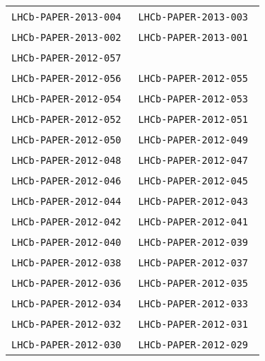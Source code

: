\begin{center}
\begin{longtable}{ll}
\texttt{LHCb-PAPER-2013-004}~\cite{LHCb-PAPER-2013-004} &
\texttt{LHCb-PAPER-2013-003}~\cite{LHCb-PAPER-2013-003} \\
\texttt{LHCb-PAPER-2013-002}~\cite{LHCb-PAPER-2013-002} &
\texttt{LHCb-PAPER-2013-001}~\cite{LHCb-PAPER-2013-001} \\
\midrule
\texttt{LHCb-PAPER-2012-057}~\cite{LHCb-PAPER-2012-057} \\
\texttt{LHCb-PAPER-2012-056}~\cite{LHCb-PAPER-2012-056} & 
\texttt{LHCb-PAPER-2012-055}~\cite{LHCb-PAPER-2012-055} \\
\texttt{LHCb-PAPER-2012-054}~\cite{LHCb-PAPER-2012-054} & 
\texttt{LHCb-PAPER-2012-053}~\cite{LHCb-PAPER-2012-053} \\
\texttt{LHCb-PAPER-2012-052}~\cite{LHCb-PAPER-2012-052} & 
\texttt{LHCb-PAPER-2012-051}~\cite{LHCb-PAPER-2012-051} \\
\texttt{LHCb-PAPER-2012-050}~\cite{LHCb-PAPER-2012-050} & 
\texttt{LHCb-PAPER-2012-049}~\cite{LHCb-PAPER-2012-049} \\
\texttt{LHCb-PAPER-2012-048}~\cite{LHCb-PAPER-2012-048} & 
\texttt{LHCb-PAPER-2012-047}~\cite{LHCb-PAPER-2012-047} \\
\texttt{LHCb-PAPER-2012-046}~\cite{LHCb-PAPER-2012-046} & 
\texttt{LHCb-PAPER-2012-045}~\cite{LHCb-PAPER-2012-045} \\
\texttt{LHCb-PAPER-2012-044}~\cite{LHCb-PAPER-2012-044} & 
\texttt{LHCb-PAPER-2012-043}~\cite{LHCb-PAPER-2012-043} \\
\texttt{LHCb-PAPER-2012-042}~\cite{LHCb-PAPER-2012-042} & 
\texttt{LHCb-PAPER-2012-041}~\cite{LHCb-PAPER-2012-041} \\
\texttt{LHCb-PAPER-2012-040}~\cite{LHCb-PAPER-2012-040} & 
\texttt{LHCb-PAPER-2012-039}~\cite{LHCb-PAPER-2012-039} \\
\texttt{LHCb-PAPER-2012-038}~\cite{LHCb-PAPER-2012-038} & 
\texttt{LHCb-PAPER-2012-037}~\cite{LHCb-PAPER-2012-037} \\
\texttt{LHCb-PAPER-2012-036}~\cite{LHCb-PAPER-2012-036} & 
\texttt{LHCb-PAPER-2012-035}~\cite{LHCb-PAPER-2012-035} \\
\texttt{LHCb-PAPER-2012-034}~\cite{LHCb-PAPER-2012-034} & 
\texttt{LHCb-PAPER-2012-033}~\cite{LHCb-PAPER-2012-033} \\
\texttt{LHCb-PAPER-2012-032}~\cite{LHCb-PAPER-2012-032} & 
\texttt{LHCb-PAPER-2012-031}~\cite{LHCb-PAPER-2012-031} \\
\texttt{LHCb-PAPER-2012-030}~\cite{LHCb-PAPER-2012-030} & 
\texttt{LHCb-PAPER-2012-029}~\cite{LHCb-PAPER-2012-029} \\

\end{longtable}
\end{center}
